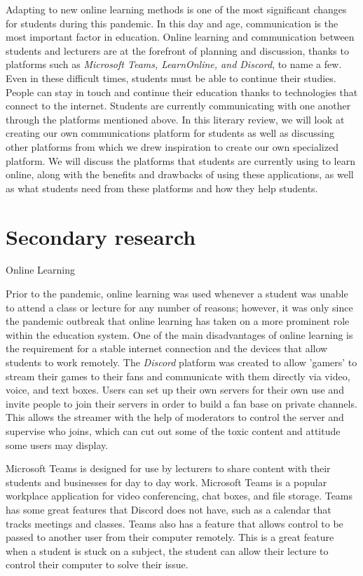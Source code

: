 Adapting to new online learning methods is one of the most significant changes for students during this pandemic. In this day and age, communication is the most important factor in education. Online learning and communication between students and lecturers are at the forefront of planning and discussion, thanks to platforms such as \textit{Microsoft Teams, LearnOnline, and Discord}, to name a few.
Even in these difficult times, students must be able to continue their studies. People can stay in touch and continue their education thanks to technologies that connect to the internet. Students are currently communicating with one another through the platforms mentioned above.
In this literary review, we will look at creating our own communications platform for students as well as discussing other platforms from which we drew inspiration to create our own specialized platform. We will discuss the platforms that students are currently using to learn online, along with the benefits and drawbacks of using these applications, as well as what students need from these platforms and how they help students.


\section{Secondary research}
Online Learning 

Prior to the pandemic, online learning was used whenever a student was unable to attend a class or lecture for any number of reasons; however, it was only since the pandemic outbreak that online learning has taken on a more prominent role within the education system. One of the main disadvantages of online learning is the requirement for a stable internet connection and the devices that allow students to work remotely.
The \textit{Discord} platform was created to allow 'gamers' to stream their games to their fans and communicate with them directly via video, voice, and text boxes. Users can set up their own servers for their own use and invite people to join their servers in order to build a fan base on private channels. This allows the streamer with the help of moderators to control the server and supervise who joins, which can cut out some of the toxic content and attitude some users may display.

Microsoft Teams is designed for use by lecturers to share content with their students and businesses for day to day work. Microsoft Teams is a popular workplace application for video conferencing, chat boxes, and file storage. Teams has some great features that Discord does not have, such as a calendar that tracks meetings and classes. Teams also has a feature that allows control to be passed to another user from their computer remotely. This is a great feature when a student is stuck on a subject, the student can allow their lecture to control their computer to solve their issue.  \cite{ref1} \hfill \break




